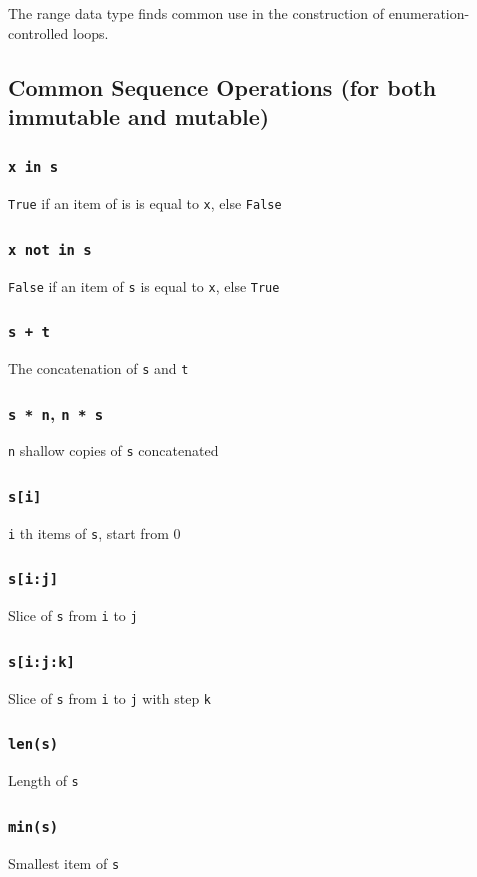 \documentclass[12pt]{book}
\begin{document}
The range data type finds common use in the construction of enumeration-controlled loops.
\subsection{Common Sequence Operations (for both immutable and mutable)}
\label{sec:org90603db}
\subsubsection{\texttt{x in s}}
\label{sec:orgddba822}
\texttt{True} if an item of is is equal to \texttt{x}, else \texttt{False}
\subsubsection{\texttt{x not in s}}
\label{sec:orgb59a814}
\texttt{False} if an item of \texttt{s} is equal to \texttt{x}, else \texttt{True}
\subsubsection{\texttt{s + t}}
\label{sec:org56d14f2}
The concatenation of \texttt{s} and \texttt{t}
\subsubsection{\texttt{s * n}, \texttt{n * s}}
\label{sec:org1a09255}
\texttt{n} shallow copies of \texttt{s} concatenated
\subsubsection{\texttt{s[i]}}
\label{sec:org25e0d97}
\texttt{i} th items of \texttt{s}, start from 0
\subsubsection{\texttt{s[i:j]}}
\label{sec:orge527a99}
Slice of \texttt{s} from \texttt{i} to \texttt{j}
\subsubsection{\texttt{s[i:j:k]}}
\label{sec:org340701d}
Slice of \texttt{s} from \texttt{i} to \texttt{j} with step \texttt{k}
\subsubsection{\texttt{len(s)}}
\label{sec:org6328686}
Length of \texttt{s}
\subsubsection{\texttt{min(s)}}
\label{sec:orgf0005c6}
Smallest item of \texttt{s}
\end{document}
